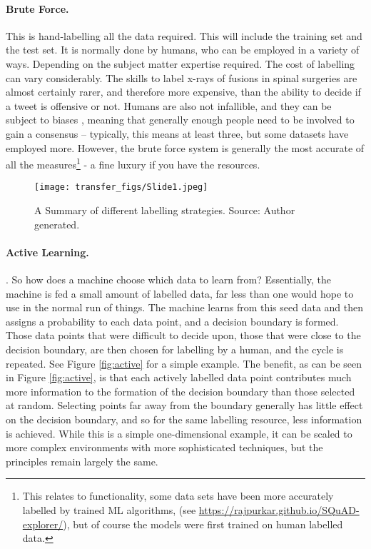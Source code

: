 \paragraph{Brute Force.} This is hand-labelling all the data required. This will include the training set and the test set. It is normally done by humans, who can be employed in a variety of ways. Depending on the subject matter expertise required. The cost of labelling can vary considerably. The skills to label x-rays of fusions in spinal surgeries are almost certainly rarer, and therefore more expensive, than the ability to decide if a tweet is offensive or not. Humans are also not infallible, and they can be subject to biases  \parencite{kahneman2011thinking}, meaning that generally enough people need to be involved to gain a consensus – typically, this means at least three, but some datasets have employed more. However, the brute force system is generally the most accurate of all the measures\footnote{This relates to  functionality, some data sets have been more accurately labelled by trained ML algorithms, (see \url{https://rajpurkar.github.io/SQuAD-explorer/}), but of course the models were first trained on human labelled data.}  - a fine luxury if you have the resources.

\begin{figure}
  \texttt{[image: transfer\_figs/Slide1.jpeg]}
  \caption{A Summary of different labelling strategies. Source: Author generated.}
  \label{fig:label}
\end{figure}






\paragraph{Active Learning.}   \parencite{settles2009active}. So how does a machine choose which data to learn from? Essentially, the machine is fed a small amount of labelled data, far less than one would hope to use in the normal run of things. The machine learns from this seed data and then assigns a probability to each data point, and a decision boundary is formed. Those data points that were difficult to decide upon, those that were close to the decision boundary, are then chosen for labelling by a human, and the cycle is repeated. See Figure \ref{fig:active} for a simple example. The benefit, as can be seen in Figure \ref{fig:active}, is that each actively labelled data point contributes much more information to the formation of the decision boundary than those selected at random. Selecting points far away from the boundary generally has little effect on the decision boundary, and so for the same labelling resource, less information is achieved. While this is a simple one-dimensional example, it can be scaled to more complex environments with more sophisticated techniques, but the principles remain largely the same.


